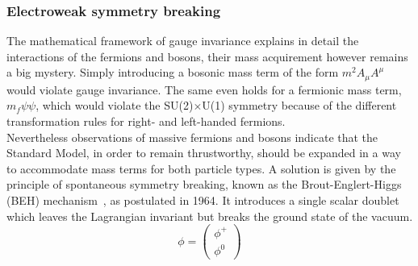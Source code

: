 \subsubsection{Electroweak symmetry breaking} \label{sec::EWSB}
The mathematical framework of gauge invariance explains in detail the interactions of the fermions and bosons, their mass acquirement however remains a big mystery. Simply introducing a bosonic mass term of the form $m^{2} A_{\mu}A^{\mu}$ would violate gauge invariance.
The same even holds for a fermionic mass term, $m_{f} \psi \psi$, which would violate the SU(2)$\times$U(1) symmetry because of the different transformation rules for right- and left-handed fermions.
\\
Nevertheless observations of massive fermions and bosons indicate that the Standard Model, in order to remain thrustworthy, should be expanded in a way to accommodate mass terms for both particle types.
A solution is given by the principle of spontaneous symmetry breaking, known as the Brout-Englert-Higgs (BEH) mechanism~\cite{Englert, Higgs, Kibble}, as postulated in 1964.
It introduces a single scalar doublet which leaves the Lagrangian invariant but breaks the ground state of the vacuum.
\begin{equation}
 \phi = \begin{pmatrix}
            \phi^{+} \\
            \phi^{0}
           \end{pmatrix}
\end{equation}
